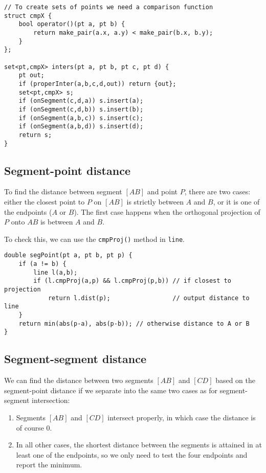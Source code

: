 
\begin{lstlisting}
// To create sets of points we need a comparison function
struct cmpX {
    bool operator()(pt a, pt b) {
        return make_pair(a.x, a.y) < make_pair(b.x, b.y);
    }
};

set<pt,cmpX> inters(pt a, pt b, pt c, pt d) {
    pt out;
    if (properInter(a,b,c,d,out)) return {out};
    set<pt,cmpX> s;
    if (onSegment(c,d,a)) s.insert(a);
    if (onSegment(c,d,b)) s.insert(b);
    if (onSegment(a,b,c)) s.insert(c);
    if (onSegment(a,b,d)) s.insert(d);
    return s;
}
\end{lstlisting}

\subsection{Segment-point distance}
To find the distance between segment $[AB]$ and point $P$, there are two cases: either the closest point to $P$ on $[AB]$ is strictly between $A$ and $B$, or it is one of the endpoints ($A$ or $B$). The first case happens when the orthogonal projection of $P$ onto $AB$ is between $A$ and $B$.


To check this, we can use the \lstinline|cmpProj()| method in \lstinline|line|.%
\begin{lstlisting}
double segPoint(pt a, pt b, pt p) {
    if (a != b) {
        line l(a,b);
        if (l.cmpProj(a,p) && l.cmpProj(p,b)) // if closest to projection
            return l.dist(p);                 // output distance to line
    }
    return min(abs(p-a), abs(p-b)); // otherwise distance to A or B
}
\end{lstlisting}

\subsection{Segment-segment distance}
We can find the distance between two segments $[AB]$ and $[CD]$ based on the segment-point distance if we separate into the same two cases as for segment-segment intersection:
\begin{enumerate}
\item Segments $[AB]$ and $[CD]$ intersect properly, in which case the distance is of course 0.
\item In all other cases, the shortest distance between the segments is attained in at least one of the endpoints, so we only need to test the four endpoints and report the minimum.
\end{enumerate}

